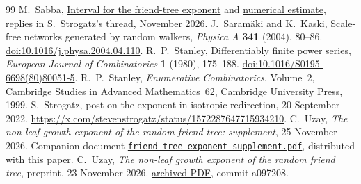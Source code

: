 \documentclass[11pt]{article}
\newcommand{\proofsrc}[2]{\href{https://github.com/uzay-eth/friend-tree-exponent/blob/a0972085ad72ad5685ae7b424988648d1965e73c/#1}{#2}}
\theoremstyle{remark}
\begin{document}
\begin{thebibliography}{99}
 M.~Sabba, \href{https://x.com/ma_sabba/status/2124768206141206762}{Interval for the friend-tree exponent} and \href{https://x.com/ma_sabba/status/2124791407667716208}{numerical estimate}, replies in S.~Strogatz's thread, November 2026.
 J.~Saram\"aki and K.~Kaski, Scale-free networks generated by random walkers, \emph{Physica A} \textbf{341} (2004), 80--86. \href{https://doi.org/10.1016/j.physa.2004.04.110}{doi:10.1016/j.physa.2004.04.110}.
 R.~P.~Stanley, Differentiably finite power series, \emph{European Journal of Combinatorics} \textbf{1} (1980), 175--188. \href{https://doi.org/10.1016/S0195-6698(80)80051-5}{doi:10.1016/S0195-6698(80)80051-5}.
 R.~P.~Stanley, \emph{Enumerative Combinatorics}, Volume~2, Cambridge Studies in Advanced Mathematics~62, Cambridge University Press, 1999.
 S.~Strogatz, post on the exponent in isotropic
redirection, 20 September 2022.
\url{https://x.com/stevenstrogatz/status/1572287647715934210}.
 C.~Uzay, \emph{The non-leaf growth exponent of the random friend tree: supplement}, 25 November 2026. Companion document \href{friend-tree-exponent-supplement.pdf}{\texttt{friend-tree-exponent-supplement.pdf}}, distributed with this paper.
 C.~Uzay, \emph{The non-leaf growth exponent of the random friend tree}, preprint, 23 November 2026. \proofsrc{paper/friend-tree-exponent.pdf}{archived PDF}, commit a097208.
\end{thebibliography}
\end{document}
